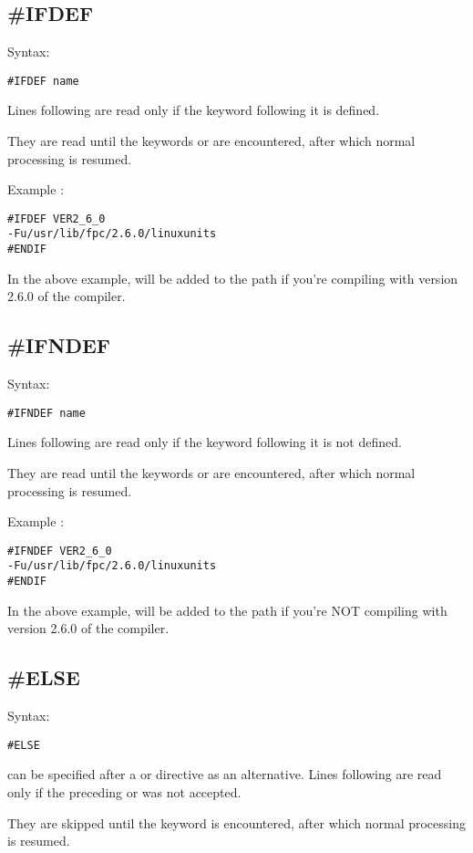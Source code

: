 \subsection{\#IFDEF}
Syntax:
\begin{verbatim}
#IFDEF name
\end{verbatim}
Lines following  are read only if the keyword 
following it is defined.

They are read until the keywords  or  are
encountered, after which normal processing is resumed.

Example :
\begin{verbatim}
#IFDEF VER2_6_0
-Fu/usr/lib/fpc/2.6.0/linuxunits
#ENDIF
\end{verbatim}
In the above example,  will be added to
the path if you're compiling with version 2.6.0 of the compiler.

\subsection{\#IFNDEF}
Syntax:
\begin{verbatim}
#IFNDEF name
\end{verbatim}
Lines following  are read only if the keyword 
following it is not defined.

They are read until the keywords  or  are
encountered, after which normal processing is resumed.

Example :
\begin{verbatim}
#IFNDEF VER2_6_0
-Fu/usr/lib/fpc/2.6.0/linuxunits
#ENDIF
\end{verbatim}
In the above example,  will be added to
the path if you're NOT compiling with version 2.6.0 of the compiler.

\subsection{\#ELSE}
Syntax:
\begin{verbatim}
#ELSE
\end{verbatim}
 can be specified after a  or 
directive as an alternative.
Lines following  are read only if the preceding 
or  was not accepted.

They are skipped until the keyword  is
encountered, after which normal processing is resumed.

